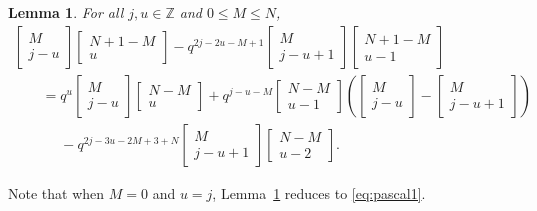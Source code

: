 \documentclass[11pt]{article}
\numberwithin{equation}{section}
\newtheorem{Lemma}[Theorem]{Lemma}
\newcommand{\field}[1]{\mathbb{#1}}
\newcommand{\Z}{\field{Z}}
\begin{document}
\begin{Lemma}
\label{lem:tech1}
For all $j,u \in \Z$ and $0\leq M\leq N$,
\begin{gather*}
\begin{bmatrix}
M\\
j-u
\end{bmatrix} \begin{bmatrix}
N+1-M\\
u
\end{bmatrix}-q^{2j-2u-M+1}\begin{bmatrix}
M\\
j-u+1
\end{bmatrix} \begin{bmatrix}
N+1-M\\
u-1
\end{bmatrix}\\
\qquad=q^{u}\begin{bmatrix}
M\\
j-u
\end{bmatrix} \begin{bmatrix}
N-M\\
u
\end{bmatrix}
+q^{j-u-M}\begin{bmatrix}
N-M\\
u-1
\end{bmatrix}\left(\begin{bmatrix}
M\\
j-u
\end{bmatrix}-\begin{bmatrix}
M\\
j-u+1
\end{bmatrix}\right)\\
\phantom{\qquad=}{} -q^{2j-3u-2M+3+N}\begin{bmatrix}
M\\
j-u+1
\end{bmatrix} \begin{bmatrix}
N-M\\
u-2
\end{bmatrix} .
\end{gather*}
\end{Lemma}

Note that when $M=0$ and $u=j$, Lemma~\ref{lem:tech1} reduces to \eqref{eq:pascal1}.
\end{document}
